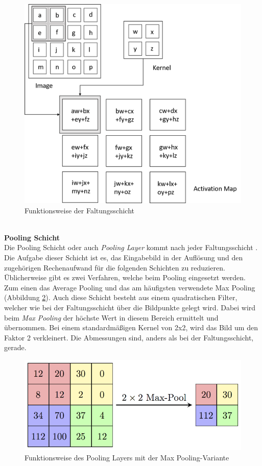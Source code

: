 \begin{figure}
	[h]
	\centering
	\includegraphics[scale=0.4]{Sources/CNN.png}
	\caption{Funktionsweise der Faltungsschicht \cite[330]{goodfellow2016deep}}
	\label{img:faltungsschicht}
\end{figure}\\
\textbf{Pooling Schicht}\\
Die Pooling Schicht oder auch \textit{Pooling Layer} kommt nach jeder Faltungsschicht \cite[336f.]{goodfellow2016deep}. Die Aufgabe dieser Schicht ist es, das Eingabebild in der Auflösung und den zugehörigen Rechenaufwand für die folgenden Schichten zu reduzieren. Üblicherweise gibt es zwei Verfahren, welche beim Pooling eingesetzt werden. Zum einen das Average Pooling und das am häufigsten verwendete Max Pooling (Abbildung \ref{img:maxpooling}). Auch diese Schicht besteht aus einem quadratischen Filter, welcher wie bei der Faltungsschicht über die Bildpunkte gelegt wird. Dabei wird beim \textit{Max Pooling} der höchste Wert in diesem Bereich ermittelt und übernommen. Bei einem standardmäßigen Kernel von 2x2, wird das Bild um den Faktor 2 verkleinert. Die Abmessungen sind, anders als bei der Faltungsschicht, gerade.
\begin{figure}
	[h]
	\centering
	\includegraphics[scale=1.8]{Sources/MaxpoolSample2.png}
	\caption{Funktionsweise des Pooling Layers mit der Max Pooling-Variante \cite{pooling2018layer}}
	\label{img:maxpooling}
\end{figure}\\
